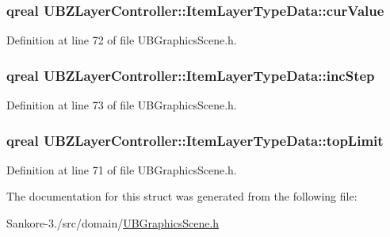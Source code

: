 \hypertarget{struct_u_b_z_layer_controller_1_1_item_layer_type_data_a6755368cd20833ee440801fa300d0a3f}{
\subsubsection[{cur\-Value}]{\setlength{\rightskip}{0pt plus 5cm}qreal U\-B\-Z\-Layer\-Controller\-::\-Item\-Layer\-Type\-Data\-::cur\-Value}}\label{d7/d85/struct_u_b_z_layer_controller_1_1_item_layer_type_data_a6755368cd20833ee440801fa300d0a3f}


Definition at line 72 of file U\-B\-Graphics\-Scene.\-h.

\hypertarget{struct_u_b_z_layer_controller_1_1_item_layer_type_data_a7f30123bd088950ec020984618d2dba7}{
\subsubsection[{inc\-Step}]{\setlength{\rightskip}{0pt plus 5cm}qreal U\-B\-Z\-Layer\-Controller\-::\-Item\-Layer\-Type\-Data\-::inc\-Step}}\label{d7/d85/struct_u_b_z_layer_controller_1_1_item_layer_type_data_a7f30123bd088950ec020984618d2dba7}


Definition at line 73 of file U\-B\-Graphics\-Scene.\-h.

\hypertarget{struct_u_b_z_layer_controller_1_1_item_layer_type_data_aa612bdd84c3e825a8d397fb9587c538d}{
\subsubsection[{top\-Limit}]{\setlength{\rightskip}{0pt plus 5cm}qreal U\-B\-Z\-Layer\-Controller\-::\-Item\-Layer\-Type\-Data\-::top\-Limit}}\label{d7/d85/struct_u_b_z_layer_controller_1_1_item_layer_type_data_aa612bdd84c3e825a8d397fb9587c538d}


Definition at line 71 of file U\-B\-Graphics\-Scene.\-h.



The documentation for this struct was generated from the following file\-:\begin{DoxyCompactItemize}
\item 
Sankore-\/3./src/domain/\hyperlink{_u_b_graphics_scene_8h}{U\-B\-Graphics\-Scene.\-h}\end{DoxyCompactItemize}
